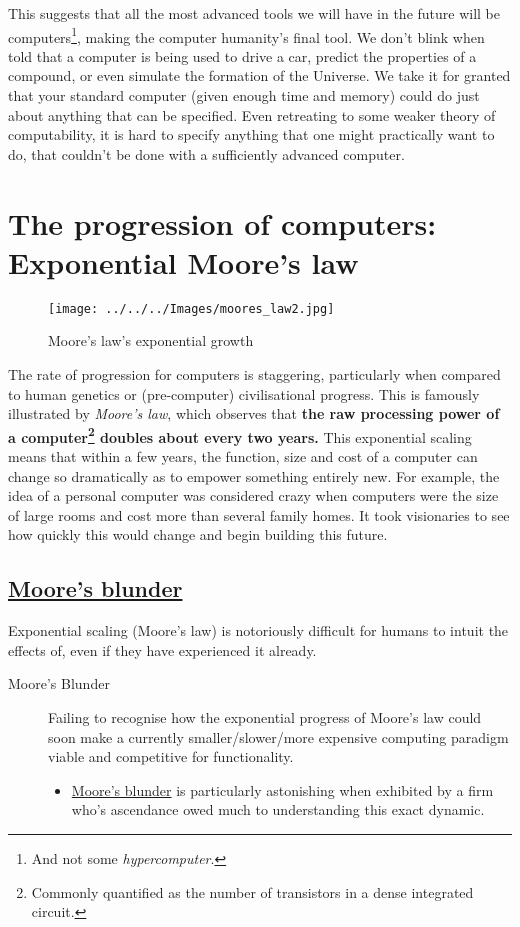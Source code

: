 \documentclass[logo,bsc,singlespacing,parskip]{infthesis}
\begin{document}
This suggests that all the most advanced tools we will have in the future will be computers\footnote{And not some \emph{hypercomputer}.}, making the computer humanity's final tool.
We don't blink when told that a computer is being used to drive a car, predict the properties of a compound, or even simulate the formation of the Universe.
We take it for granted that your standard computer (given enough time and memory) could do just about anything that can be specified.
Even retreating to some weaker theory of computability, it is hard to specify anything that one might practically want to do, that couldn't be done with a sufficiently advanced computer.

\section{The progression of computers: Exponential Moore's law}
\label{sec:org97180ae}
\begin{wrapfigure}{l}{0.51\textwidth}
\centering
\texttt{[image: ../../../Images/moores\_law2.jpg]}
\caption{Moore's law's exponential growth}
\end{wrapfigure}

The rate of progression for computers is staggering, particularly when compared to human genetics or (pre-computer) civilisational progress.
This is famously illustrated by \emph{Moore's law}, which observes that \textbf{the raw processing power of a computer\footnote{Commonly quantified as the number of transistors in a dense integrated circuit.} doubles about every two years.}
This exponential scaling means that within a few years, the function, size and cost of a computer can change so dramatically as to empower something entirely new.
For example, the idea of a personal computer was considered crazy when computers were the size of large rooms and cost more than several family homes.
It took visionaries to see how quickly this would change and begin building this future.
\subsection{\hyperref[org4e0f6c1]{Moore's blunder}}
\label{sec:org65142ce}
Exponential scaling (Moore's law) is notoriously difficult for humans to intuit the effects of, even if they have experienced it already.

\begin{mdframed}
\begin{description}
\item[{\label{org4e0f6c1}Moore's Blunder}] Failing to recognise how the exponential progress of Moore's law could soon make a currently smaller/slower/more expensive computing paradigm viable and competitive for functionality.
\begin{itemize}
\item \hyperref[org4e0f6c1]{Moore's blunder} is particularly astonishing when exhibited by a firm who's ascendance owed much to understanding this exact dynamic.
\end{itemize}
\end{description}
\end{mdframed}
\end{document}
